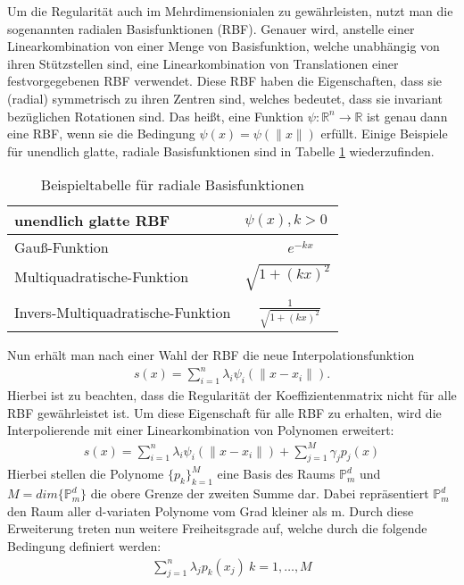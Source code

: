 \documentclass[a4paper,11pt]{article}
\begin{document}
Um die Regularität auch im Mehrdimensionialen zu gewährleisten, nutzt man die sogenannten radialen Basisfunktionen (RBF). Genauer wird, anstelle einer Linearkombination von einer Menge von Basisfunktion, welche unabhängig von ihren Stützstellen sind, eine Linearkombination von Translationen einer festvorgegebenen RBF verwendet. Diese RBF haben die Eigenschaften, dass sie (radial) symmetrisch zu ihren Zentren sind, welches bedeutet, dass sie invariant bezüglichen Rotationen sind. Das heißt, eine Funktion $\psi:\mathbb{R}^n\rightarrow\mathbb{R}$ ist genau dann eine RBF, wenn sie die Bedingung $\psi(x)=\psi(\|x\|)$ erfüllt. Einige Beispiele für unendlich glatte, radiale Basisfunktionen sind in Tabelle \ref{tbl:funktionstabelle} wiederzufinden.
\begin{table}
\centering
\begin{tabular}{|l|l|}
\hline
\textbf{unendlich glatte RBF}  & \textbf{$\psi(x), k>0$} \\
\hline
\rule{0pt}{15pt}Gauß-Funktion&~~~~~~$e^{-kx}$\\
\rule{0pt}{15pt}Multiquadratische-Funktion& $\sqrt{1+(kx)^2}$\\
\rule{0pt}{15pt}Invers-Multiquadratische-Funktion&~~$\frac{1}{\sqrt{1+(kx)^2}}$\\
\hline
\end{tabular}
\caption{Beispieltabelle für radiale Basisfunktionen}
\label{tbl:funktionstabelle}
\end{table}
Nun erhält man nach einer Wahl der RBF die neue Interpolationsfunktion
\begin{align}
 s(x)=\sum_{i=1}^n\lambda_i\psi_i(\|x-x_i\|).
\end{align}
Hierbei ist zu beachten, dass die Regularität der Koeffizientenmatrix nicht für alle RBF gewährleistet ist. Um diese Eigenschaft für alle RBF zu erhalten, wird die Interpolierende mit einer Linearkombination von Polynomen erweitert:
\begin{align}
 s(x)=\sum_{i=1}^n\lambda_i\psi_i(\|x-x_i\|)+\sum_{j=1}^M\gamma_jp_j(x)
\end{align}
Hierbei stellen die Polynome $\{p_k\}_{k=1}^M$ eine Basis des Raums $\mathbb{P}_m^d$ und $M=dim\{\mathbb{P}_m^d\}$ die obere Grenze der zweiten Summe dar. Dabei repräsentiert $\mathbb{P}_m^d$ den Raum aller d-variaten Polynome vom Grad kleiner als m. Durch diese Erweiterung treten nun weitere Freiheitsgrade auf, welche durch die folgende Bedingung definiert werden:
\begin{align}
 \sum_{j=1}^n\lambda_jp_k(x_j)~k=1,\dots,M
\end{align}
\end{document}

